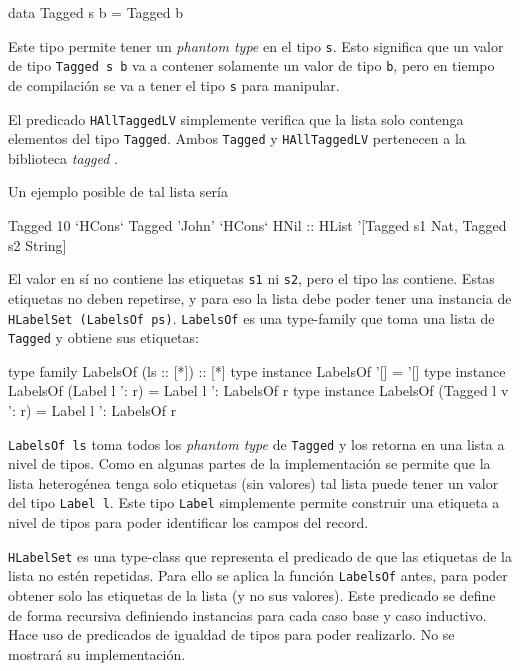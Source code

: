 \begin{code}
data Tagged s b = Tagged b
\end{code}

Este tipo permite tener un \textit{phantom type} en el tipo \texttt{s}. Esto significa que un valor de tipo \texttt{Tagged s b} va a contener solamente un valor de tipo \texttt{b}, pero en tiempo de compilación se va a tener el tipo \texttt{s} para manipular.

El predicado \texttt{HAllTaggedLV} simplemente verifica que la lista solo contenga elementos del tipo \texttt{Tagged}. Ambos \texttt{Tagged} y \texttt{HAllTaggedLV} pertenecen a la biblioteca \textit{tagged} \cite{HaskellTagged}. 

Un ejemplo posible de tal lista sería

\begin{code}
Tagged 10 `HCons` Tagged 'John' `HCons` HNil :: 
  HList '[Tagged s1 Nat, Tagged s2 String]
\end{code}

El valor en sí no contiene las etiquetas \texttt{s1} ni \texttt{s2}, pero el tipo las contiene. Estas etiquetas no deben repetirse, y para eso la lista debe poder tener una instancia de \texttt{HLabelSet (LabelsOf ps)}. \texttt{LabelsOf} es una type-family que toma una lista de \texttt{Tagged} y obtiene sus etiquetas:

\begin{code}
type family LabelsOf (ls :: [*]) :: [*]
type instance LabelsOf '[] = '[]
type instance LabelsOf (Label l ': r)  = Label l ': LabelsOf r
type instance LabelsOf (Tagged l v ': r) = Label l ': LabelsOf r
\end{code}

\texttt{LabelsOf ls} toma todos los \textit{phantom type} de \texttt{Tagged} y los retorna en una lista a nivel de tipos. Como en algunas partes de la implementación se permite que la lista heterogénea tenga solo etiquetas (sin valores) tal lista puede tener un valor del tipo \texttt{Label l}. Este tipo \texttt{Label} simplemente permite construir una etiqueta a nivel de tipos para poder identificar los campos del record.

\texttt{HLabelSet} es una type-class que representa el predicado de que las etiquetas de la lista no estén repetidas. Para ello se aplica la función \texttt{LabelsOf} antes, para poder obtener solo las etiquetas de la lista (y no sus valores). Este predicado se define de forma recursiva definiendo instancias para cada caso base y caso inductivo. Hace uso de predicados de igualdad de tipos para poder realizarlo. No se mostrará su implementación. 


